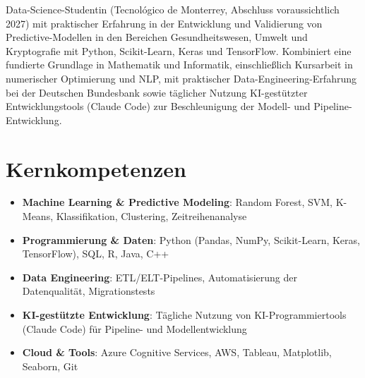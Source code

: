 \documentclass[11pt,a4paper,sans]{moderncv}
\begin{document}
\makecvtitle


\vspace{6pt}
\small{Data-Science-Studentin (Tecnológico de Monterrey, Abschluss voraussichtlich 2027) mit praktischer Erfahrung in der Entwicklung und Validierung von Predictive-Modellen in den Bereichen Gesundheitswesen, Umwelt und Kryptografie mit Python, Scikit-Learn, Keras und TensorFlow. Kombiniert eine fundierte Grundlage in Mathematik und Informatik, einschließlich Kursarbeit in numerischer Optimierung und NLP, mit praktischer Data-Engineering-Erfahrung bei der Deutschen Bundesbank sowie täglicher Nutzung KI-gestützter Entwicklungstools (Claude Code) zur Beschleunigung der Modell- und Pipeline-Entwicklung.}


\section{Kernkompetenzen}
\vspace{1pt}
\begin{itemize}

\item \textbf{Machine Learning \& Predictive Modeling}: Random Forest, SVM, K-Means, Klassifikation, Clustering, Zeitreihenanalyse

\item \textbf{Programmierung \& Daten}: Python (Pandas, NumPy, Scikit-Learn, Keras, TensorFlow), SQL, R, Java, C++

\item \textbf{Data Engineering}: ETL/ELT-Pipelines, Automatisierung der Datenqualität, Migrationstests

\item \textbf{KI-gestützte Entwicklung}: Tägliche Nutzung von KI-Programmiertools (Claude Code) für Pipeline- und Modellentwicklung

\item \textbf{Cloud \& Tools}: Azure Cognitive Services, AWS, Tableau, Matplotlib, Seaborn, Git

\end{itemize}

\end{document}

